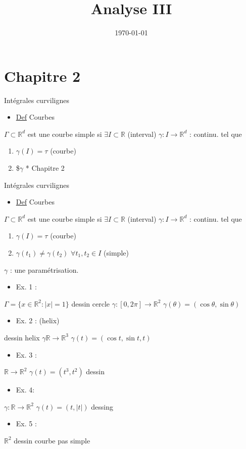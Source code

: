 \documentclass[11pt]{article}
\date{\today}
\title{Analyse III}
\begin{document}
\maketitle
\tableofcontents


\section{Chapitre 2}
\label{sec:orgheadline1}
Intégrales curvilignes
\begin{itemize}
\item \uline{Def} Courbes
\end{itemize}
\(\Gamma \subset \mathbb{R}^d\) est une courbe simple si \(\exists I \subset \mathbb{R}\)  (interval) \(\gamma: I \rightarrow \mathbb{R}^d\) : continu. tel que
\begin{enumerate}
\item \(\gamma (I) = \tau\) (courbe)
\item \$\(\gamma\) * Chapitre 2
\end{enumerate}
Intégrales curvilignes

\begin{itemize}
\item \uline{Def} Courbes
\end{itemize}
\(\Gamma \subset \mathbb{R}^d\) est une courbe simple si \(\exists I \subset \mathbb{R}\)  (interval) \(\gamma: I \rightarrow \mathbb{R}^d\) : continu. tel que
\begin{enumerate}
\item \(\gamma (I) = \tau\) (courbe)
\item \(\gamma (t_1) \neq \gamma(t_2)\) \(\forall t_1,t_2 \in I\) (simple)
\end{enumerate}
\(\gamma\) : une paramétrisation.

\begin{itemize}
\item Ex. 1 :
\end{itemize}
\(\Gamma = \{ x \in \mathbb{R}^2 : |x|=1\}\)
dessin cercle \(\gamma: \left[0,2\pi\right] \rightarrow \mathbb{R}^2\) \(\gamma(\theta) = (\cos \theta, \sin \theta)\)
\begin{itemize}
\item Ex. 2 : (helix)
\end{itemize}
dessin helix \(\gamma \mathbb{R} \rightarrow \mathbb{R}^3\) \(\gamma(t) = (\cos t, \sin t,t)\)
\begin{itemize}
\item Ex. 3 :
\end{itemize}
\(\mathbb{R} \rightarrow \mathbb{R}^2\)
\(\gamma(t) = (t^3,t^2)\)
dessin
\begin{itemize}
\item Ex. 4:
\end{itemize}
\(\gamma : \mathbb{R} \rightarrow \mathbb{R}^2\)
\(\gamma(t) = (t,|t|)\)
dessing
\begin{itemize}
\item Ex. 5 :
\end{itemize}
\(\mathbb{R}^2\) dessin courbe pas simple
\end{document}
